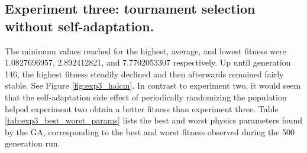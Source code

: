

\newpage

\subsection[Experiment Three]{Experiment three: tournament selection without self-adaptation.}

The minimum values reached for the highest, average, and lowest fitness were 1.0827696957, 2.892412821, and 7.7702053307 respectively. Up until generation 146, the highest fitness steadily declined and then afterwards remained fairly stable. See Figure \ref{fig:exp3_halcm}. In contrast to experiment two, it would seem that the self-adaptation side effect of periodically randomizing the population helped experiment two obtain a better fitness than experiment three. Table \ref{tab:exp3_best_worst_params} lists the best and worst physics parameters found by the GA, corresponding to the best and worst fitness observed during the 500 generation run.

